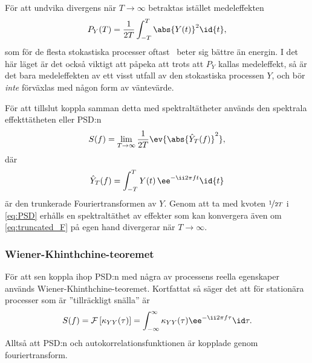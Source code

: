 För att undvika divergens när $T\to\infty$ betraktas istället medeleffekten 
\begin{equation}\label{eq:power}
P_Y(T) = \frac{1}{2T} \int_{-T}^{T} \abs{Y(t)}^2\id{t},
\end{equation}
som för de flesta stokastiska processer oftast~\cite{Miller_probability2012} beter sig bättre än energin.
I det här läget är det också viktigt att påpeka att trots att $P_Y$ kallas medeleffekt, så är det bara medeleffekten av ett visst utfall av den stokastiska processen $Y$, och bör \emph{inte} förväxlas med någon form av väntevärde. 

För att tillslut koppla samman detta med spektraltätheter används den spektrala effekttätheten eller PSD:n
\begin{equation}\label{eq:PSD}
S(f) =  \lim_{T\to\infty}\dfrac{1}{2T} \ev{\abs{\hat{Y}_T(f)}^2},
\end{equation} 
där
\begin{equation}\label{eq:truncated_F}
\hat{Y}_T(f) = \int_{-T}^{T} Y(t)\,\ee^{-\ii 2\pi f t} \id{t}
\end{equation}
är den trunkerade Fouriertransformen av $Y$. Genom att ta med kvoten $\nicefrac{1}{2T}$ i \eqref{eq:PSD} erhålls en spektraltäthet av effekter som kan konvergera även om \eqref{eq:truncated_F} på egen hand divergerar när $T\to\infty$. 

\subsubsection{Wiener-Khinthchine-teoremet}
För att sen koppla ihop PSD:n med några av processens reella egenskaper används Wiener-Khinthchine-teoremet. Kortfattat så säger det att för stationära processer som är ''tillräckligt snälla'' är \cite{Miller_probability2012}
\begin{equation}\label{eq:W-K-theorem}
S(f) = \mathcal{F}\left[\kappa_{YY}(\tau)\right] 
= \int_{-\infty}^{\infty} 
\kappa_{YY}(\tau) \ee^{-\ii 2\pi f\tau} \id\tau.
\end{equation}
Alltså att PSD:n och autokorrelationsfunktionen är kopplade genom fouriertransform. 

